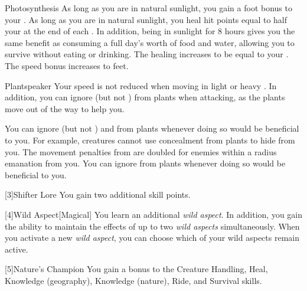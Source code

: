 {            \begin{freeability}{Photosynthesis}
                As long as you are in natural sunlight, you gain a  foot bonus to your .
                \rankline
                 As long as you are in natural sunlight, you heal hit points equal to half your  at the end of each .
                In addition, being in sunlight for 8 hours gives you the same benefit as consuming a full day's worth of food and water, allowing you to survive without eating or drinking.
                 The healing increases to be equal to your .
                 The speed bonus increases to  feet.
            \end{freeability}

            \begin{freeability}{Plantspeaker}
                Your speed is not reduced when moving in light or heavy .
                In addition, you can ignore  (but not ) from plants when attacking, as the plants move out of the way to help you.

                \rankline
                 You can ignore  (but not ) and  from plants whenever doing so would be beneficial to you.
                For example, creatures cannot use concealment from plants to hide from you.
                 The movement penalties from  are doubled for enemies within a \areahuge radius emanation from you.
                 You can ignore  from plants whenever doing so would be beneficial to you.
            \end{freeability}
        }

        [3]{Shifter Lore}
        You gain two additional skill points.

        [4]{Wild Aspect}[Magical]
        You learn an additional \textit{wild aspect}.
        In addition, you gain the ability to maintain the effects of up to two \textit{wild aspects} simultaneously.
        When you activate a new \textit{wild aspect}, you can choose which of your wild aspects remain active. 

        [5]{Nature's Champion}
        You gain a  bonus to the Creature Handling, Heal, Knowledge (geography), Knowledge (nature), Ride, and Survival skills.

